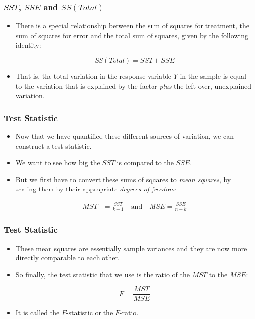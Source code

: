\documentclass[12pt]{beamer}
\begin{document}
\begin{frame}
	\frametitle{$SST$, $SSE$ and $SS(Total)$}
	
	\begin{itemize}[label={\color{blue}$\blacktriangleright$}]
		\item There is a special relationship between the sum of squares for treatment, the sum of squares for error and the total sum of squares, given by the following identity:
		
		\begin{equation*}
			SS(Total) = SST + SSE
		\end{equation*}
		
		\item That is, the total variation in the response variable $Y$ in the sample is equal to the variation that is explained by the factor \textit{plus} the left-over, unexplained variation.
	\end{itemize}
	
\end{frame}
\begin{frame}
	\frametitle{Test Statistic}
	
	\begin{itemize}[label={\color{blue}$\blacktriangleright$}]
		\item Now that we have quantified these different sources of variation, we can construct a test statistic.
		
		\item We want to see how big the $SST$ is compared to the $SSE$.
		
		\item But we first have to convert these sums of squares to \textit{mean squares}, by scaling them by their appropriate \textit{degrees of freedom}:
		
		\begin{align*}
			MST &= \frac{SST}{k - 1} \quad \text{and} \quad MSE = \frac{SSE}{n - k}
		\end{align*}
	\end{itemize}
	
\end{frame}
\begin{frame}
	\frametitle{Test Statistic}
	
	\begin{itemize}[label={\color{blue}$\blacktriangleright$}]
		\item These mean squares are essentially sample variances and they are now more directly comparable to each other.
		
		\item So finally, the test statistic that we use is the ratio of the $MST$ to the $MSE$:
		
		\begin{equation*}
			F = \frac{MST}{MSE}
		\end{equation*}
		
		\item It is called the $F$-statistic or the $F$-ratio.
	\end{itemize}
	
\end{frame}
\end{document}

